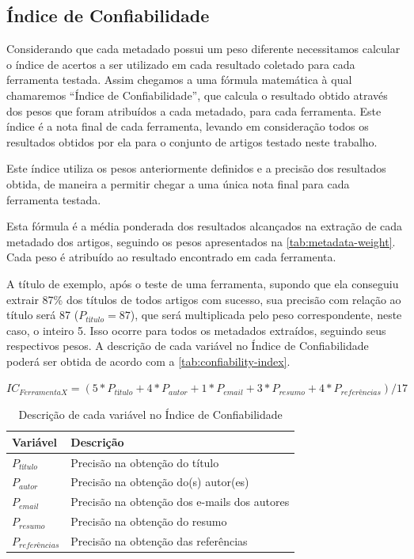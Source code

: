 \subsection{Índice de Confiabilidade}
\label{ssec:confiability-index}


Considerando que cada metadado possui um peso diferente necessitamos calcular o índice de acertos a ser utilizado em cada resultado coletado para cada ferramenta testada. Assim chegamos a uma fórmula matemática à qual chamaremos ``Índice de Confiabilidade'', que calcula o resultado obtido através dos pesos que foram atribuídos a cada metadado, para cada ferramenta. Este índice é a nota final de cada ferramenta, levando em consideração todos os resultados obtidos por ela para o conjunto de artigos testado neste trabalho.

Este índice utiliza os pesos anteriormente definidos e a precisão dos resultados obtida, de maneira a permitir chegar a uma única nota final para cada ferramenta testada.

Esta fórmula é a média ponderada dos resultados alcançados na extração de cada metadado dos artigos, seguindo os pesos apresentados na \autoref{tab:metadata-weight}. Cada peso é atribuído ao resultado encontrado em cada ferramenta. 

A título de exemplo, após o teste de uma ferramenta, supondo que ela conseguiu extrair 87\% dos títulos de todos artigos com sucesso, sua precisão com relação ao título será 87 ($P_{título}=87$), que será multiplicada pelo peso correspondente, neste caso, o inteiro 5. Isso ocorre para todos os metadados extraídos, seguindo seus respectivos pesos. A descrição de cada variável no Índice de Confiabilidade poderá ser obtida de acordo com a \autoref{tab:confiability-index}.

\begin{center}
    $ IC_{Ferramenta X}=(5*P_{título}+4*P_{autor}+1*P_{email}+3*P_{resumo}+4*P_{referências}) / 17 $
\end{center}

\begin{table}
    \caption{Descrição de cada variável no Índice de Confiabilidade}
    \begin{center}
        \begin{tabular}{|p{3cm}|p{8cm}|}
            \hline \textbf{Variável} & \textbf{Descrição}\\ 
            \hline $P_{título}$ & Precisão na obtenção do título \\
            \hline $P_{autor}$ & Precisão na obtenção do(s) autor(es)\\
            \hline $P_{email}$ & Precisão na obtenção dos e-mails dos autores \\
            \hline $P_{resumo}$ & Precisão na obtenção do resumo \\
            \hline $P_{referências}$ & Precisão na obtenção das referências \\
            \hline 
        \end{tabular} 
    \end{center}
    \label{tab:confiability-index}
\end{table}

